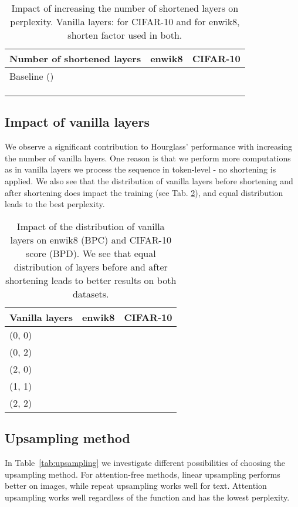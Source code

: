 \documentclass[11pt]{article}
\begin{document}
\begin{table}[ht!]
\small
\centering
\setlength{\tabcolsep}{0.95em}
\begin{tabular}{lrr}
\hline 
Number of shortened layers & enwik8 & CIFAR-10\\
\hline
Baseline () &  &  \\
\hline
 &  &  \\
 &  &  \\
 &  &  \\
\hline
\end{tabular}
\caption{Impact of increasing the number of shortened layers on perplexity.
Vanilla layers:  for CIFAR-10 and  for enwik8, shorten factor  used in both.
}
\label{tab:scaling}
\end{table}


\vspace{-5mm}
\subsection{Impact of vanilla layers}\label{sec:vanilla}
We observe a significant contribution to Hourglass' performance with increasing the number of vanilla layers. One reason is that we perform more computations as in vanilla layers we process the sequence in token-level - no shortening is applied. We also see that the distribution of vanilla layers before shortening and after shortening does impact the training (see Tab. \ref{tab:vanilla}), and equal distribution leads to the best perplexity. 


\begin{table}[ht!]
\small
\centering
\setlength{\tabcolsep}{1.9em}
\begin{tabular}{lrr}
\hline
Vanilla layers & enwik8 & CIFAR-10 \\
\hline
(0, 0) &  &  \\ 
\hline
(0, 2) &  &  \\
(2, 0) &  &  \\
(1, 1) &  &  \\
\hline
(2, 2) &  &  \\
\hline
\end{tabular}
\caption{Impact of the distribution of vanilla layers on enwik8 (BPC) and CIFAR-10 score (BPD). We see that equal distribution of layers before and after shortening leads to better results on both datasets.}
\label{tab:vanilla}
\end{table}

\subsection{Upsampling method}\label{sec:upsampling}
In Table~\ref{tab:upsampling} we investigate different possibilities of choosing the upsampling method. For attention-free methods, linear upsampling performs better on images, while repeat upsampling works well for text. Attention upsampling works well regardless of the function  and has the lowest perplexity.
\end{document}
